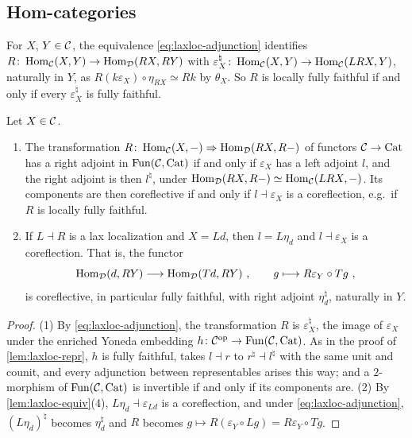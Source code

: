 \subsection{Hom-categories}
\label{subsec:laxloc-homs}

%
For $X$, $Y \in \mathcal{C}$, the equivalence \eqref{eq:laxloc-adjunction} identifies
$R\colon \operatorname{Hom}_{\mathcal{C}}(X,Y) \to \operatorname{Hom}_{\mathcal{D}}(RX,RY)$
with
$\varepsilon_{X}^{\natural}\colon \operatorname{Hom}_{\mathcal{C}}(X,Y) \to \operatorname{Hom}_{\mathcal{C}}(LRX,Y)$,
naturally in $Y$, as
$R(k\varepsilon_{X}) \circ \eta_{RX} \simeq Rk$
by $\theta_{X}$. So $R$ is locally fully faithful if and only if every
$\varepsilon_{X}^{\natural}$
is fully faithful.

\begin{prop}
\label{prop:laxloc-homs}
%
Let $X \in \mathcal{C}$.
\begin{enumerate}
\item The transformation
$R\colon \operatorname{Hom}_{\mathcal{C}}(X,-) \Rightarrow \operatorname{Hom}_{\mathcal{D}}(RX,R-)$
of functors $\mathcal{C} \to \mathrm{Cat}$ has a right adjoint in $\operatorname{Fun}(\mathcal{C},\mathrm{Cat})$ if and only
if $\varepsilon_{X}$ has a left adjoint $l$, and the right adjoint is then
$l^{\natural}$, under
$\operatorname{Hom}_{\mathcal{D}}(RX,R-) \simeq \operatorname{Hom}_{\mathcal{C}}(LRX,-)$.
Its components are then coreflective if and only if
$l \dashv \varepsilon_{X}$
is a coreflection, e.g.\ if $R$ is locally fully faithful.
\item If $L \dashv R$ is a lax localization and $X = Ld$, then
$l = L\eta_{d}$
and
$l \dashv \varepsilon_{X}$
is a coreflection. That is, the functor
\begin{equation*}
\operatorname{Hom}_{\mathcal{D}}(d,RY) \longrightarrow \operatorname{Hom}_{\mathcal{D}}(Td,RY) \ , \qquad g \longmapsto
R\varepsilon_{Y} \circ Tg \ ,
\end{equation*}
is coreflective, in particular fully faithful, with right adjoint
$\eta_{d}^{\natural}$, naturally in $Y$.
\end{enumerate}
\end{prop}

\begin{proof}
%
(1) By \eqref{eq:laxloc-adjunction}, the transformation $R$ is
$\varepsilon_{X}^{\natural}$,
the image of $\varepsilon_{X}$ under the enriched
Yoneda embedding
$h\colon \mathcal{C}^{\mathrm{op}} \to \operatorname{Fun}(\mathcal{C},\mathrm{Cat})$.
As in the proof of \cref{lem:laxloc-repr}, $h$ is fully faithful, takes
$l \dashv r$
to
$r^{\natural} \dashv l^{\natural}$
with the same unit and counit, and every adjunction between representables
arises this way; and a $2$-morphism of $\operatorname{Fun}(\mathcal{C},\mathrm{Cat})$ is invertible if and
only
if its components are. (2) By \cref{lem:laxloc-equiv}(4),
$L\eta_{d} \dashv \varepsilon_{Ld}$
is a coreflection, and under \eqref{eq:laxloc-adjunction},
$(L\eta_{d})^{\natural}$
becomes $\eta_{d}^{\natural}$ and $R$ becomes
$g \mapsto R(\varepsilon_{Y} \circ Lg) = R\varepsilon_{Y} \circ Tg$.
\end{proof}

